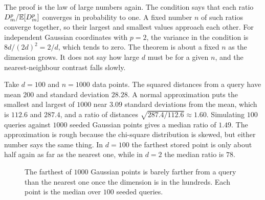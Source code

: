 The proof is the law of large numbers again. The condition says that each ratio $D_m^p/\mathbb{E}[D_m^p]$ converges in probability to one. A fixed number $n$ of such ratios converge together, so their largest and smallest values approach each other. For independent Gaussian coordinates with $p=2$, the variance in the condition is $8d/(2d)^2=2/d$, which tends to zero. The theorem is about a fixed $n$ as the dimension grows. It does not say how large $d$ must be for a given $n$, and the nearest-neighbour contrast falls slowly.

\begin{example}\label{ex:ch11:ratio}
Take $d=100$ and $n=1000$ data points. The squared distances from a query have mean $200$ and standard deviation $28.28$. A normal approximation puts the smallest and largest of $1000$ near $3.09$ standard deviations from the mean, which is $112.6$ and $287.4$, and a ratio of distances $\sqrt{287.4/112.6}\approx1.60$. Simulating $100$ queries against $1000$ seeded Gaussian points gives a median ratio of $1.49$. The approximation is rough because the chi-square distribution is skewed, but either number says the same thing. In $d=100$ the farthest stored point is only about half again as far as the nearest one, while in $d=2$ the median ratio is $78$.
\end{example}

\begin{figure}[tbp]\centering
{}
\caption{The farthest of $1000$ Gaussian points is barely farther from a query than the nearest one once the dimension is in the hundreds. Each point is the median over $100$ seeded queries.}
\label{fig:ch11:ratio}
\end{figure}

